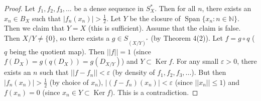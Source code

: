 \begin{proof}
  Let $f_1,f_2,f_3,...$ be a dense sequence in $S_X^*$.
  Then for all $n$, there exists an $x_n\in B_X$ such that $|f_n(x_n)|>\frac{1}{2}$.
  Let $Y$ be the closure of $\operatorname{Span}\{x_n:n\in\mathbb{N}\}$.
  Then we claim that $Y=X$ (this is sufficient).
  Assume that the claim is false. Then $X/Y\neq \{0\}$, so there exists a $g\in S_{(X/Y)^*}$
  (by Theorem 4(2)). Let $f=g\circ q$ ($q$ being the quotient map).
  Then $||f||=1$ (since $f(D_X)=g(q(D_X))=g(D_{X/Y})$)
  and $Y\subset \operatorname{Ker} f$.
  For any small $\varepsilon>0$,
   there exists an $n$ such that $||f-f_n||<\varepsilon$
   (by density of $f_1,f_2,f_3,...$).
But then
$
  |f_n(x_n)|>\frac{1}{2}$ (by choice of $x_n$),
  $|(f-f_n)(x_n)|<\varepsilon$ (since $||x_n||\leq 1$)
  and $f(x_n)=0$ (since $x_n\in Y\subset \operatorname{Ker} f$).
This is a contradiction.
\end{proof}















%
